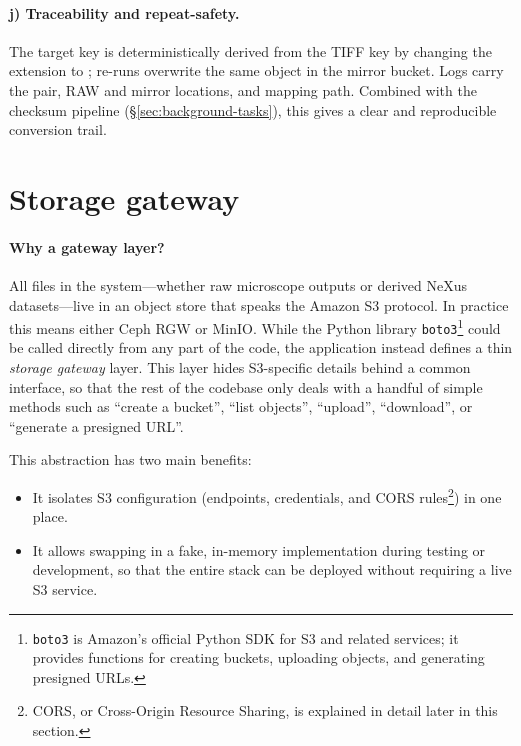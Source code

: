 \paragraph{j) Traceability and repeat-safety.}
The target key is deterministically derived from the TIFF key by changing the extension to ; re-runs overwrite the same object in the mirror bucket. Logs carry the pair, RAW and mirror locations, and mapping path. Combined with the checksum pipeline (\S\ref{sec:background-tasks}), this gives a clear and reproducible conversion trail.


\section{Storage gateway}\label{sec:storage-gateway}

\paragraph{Why a gateway layer?}
All files in the system---whether raw microscope outputs or derived NeXus datasets---live in an object store that speaks the Amazon S3 protocol. 
In practice this means either Ceph RGW or MinIO. 
While the Python library \texttt{boto3}\footnote{%
	\texttt{boto3} is Amazon’s official Python SDK for S3 and related services; 
	it provides functions for creating buckets, uploading objects, and generating presigned URLs.} 
could be called directly from any part of the code, the application instead defines a thin \emph{storage gateway} layer. 
This layer hides S3-specific details behind a common interface, 
so that the rest of the codebase only deals with a handful of simple methods 
such as ``create a bucket'', ``list objects'', ``upload'', ``download'', 
or ``generate a presigned URL''.

This abstraction has two main benefits:  
\begin{itemize}
	\item It isolates S3 configuration (endpoints, credentials, and CORS rules\footnote{%
		CORS, or Cross-Origin Resource Sharing, is explained in detail later in this section.}) in one place.  
	\item It allows swapping in a fake, in-memory implementation during testing or development, 
	so that the entire stack can be deployed without requiring a live S3 service.  
\end{itemize}

